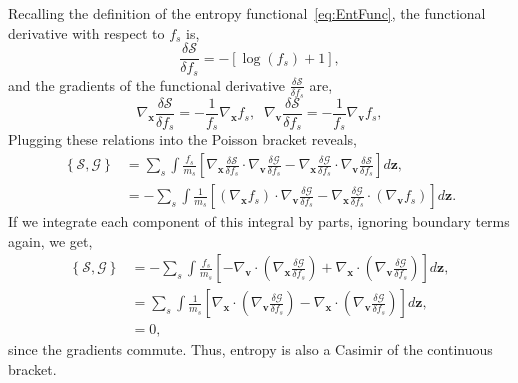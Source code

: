 \documentclass[preprint,12pt]{elsarticle}
\theoremstyle{definition}
\begin{document}
Recalling the definition of the entropy functional~\eqref{eq:EntFunc}, the functional derivative with respect to $f_s$ is,
\begin{equation*}
  \frac{\delta \mathcal{S}}{\delta f_s} = - \left[\log (f_s) + 1\right],
\end{equation*}
and the gradients of the functional derivative $\frac{\delta \mathcal{S}}{\delta f_s}$ are,
\begin{equation*}
  \nabla_{\boldsymbol{x}} \frac{\delta \mathcal{S}}{\delta f_s} = -\frac{1}{f_s} \nabla_{\boldsymbol{x}} f_s, \;\; \nabla_{\boldsymbol{v}} \frac{\delta \mathcal{S}}{\delta f_s} = -\frac{1}{f_s} \nabla_{\boldsymbol{v}} f_s,
\end{equation*}
Plugging these relations into the Poisson bracket reveals,
\begin{align*}
  \left\{\mathcal{S},\mathcal{G}\right\} &= \sum_s \int \frac{f_s}{m_s} \left[\nabla_{\boldsymbol{x}} \frac{\delta \mathcal{S}}{\delta f_s} \cdot \nabla_{\boldsymbol{v}} \frac{\delta \mathcal{G}}{\delta f_s} - \nabla_{\boldsymbol{x}} \frac{\delta \mathcal{G}}{\delta f_s} \cdot \nabla_{\boldsymbol{v}} \frac{\delta \mathcal{S}}{\delta f_s} \right] d\boldsymbol{z}, \\
  &= -\sum_s \int \frac{1}{m_s} \left[\left( \nabla_{\boldsymbol{x}} f_s\right) \cdot \nabla_{\boldsymbol{v}} \frac{\delta \mathcal{G}}{\delta f_s} - \nabla_{\boldsymbol{x}} \frac{\delta \mathcal{G}}{\delta f_s} \cdot \left(\nabla_{\boldsymbol{v}} f_s\right) \right] d\boldsymbol{z}.
\end{align*}
If we integrate each component of this integral by parts, ignoring boundary terms again, we get,
\begin{align*}
  \left\{\mathcal{S},\mathcal{G}\right\} &= -\sum_s \int \frac{f_s}{m_s} \left[-\nabla_{\boldsymbol{v}} \cdot \left( \nabla_{\boldsymbol{x}} \frac{\delta \mathcal{G}}{\delta f_s}\right) + \nabla_{\boldsymbol{x}} \cdot \left(\nabla_{\boldsymbol{v}} \frac{\delta \mathcal{G}}{\delta f_s}\right) \right] d\boldsymbol{z},\\
  &= \sum_s \int \frac{1}{m_s} \left[\nabla_{\boldsymbol{x}} \cdot \left( \nabla_{\boldsymbol{v}} \frac{\delta \mathcal{G}}{\delta f_s}\right) - \nabla_{\boldsymbol{x}} \cdot \left(\nabla_{\boldsymbol{v}} \frac{\delta \mathcal{G}}{\delta f_s}\right) \right] d\boldsymbol{z},\\
  &= 0,
\end{align*}
since the gradients commute. Thus, entropy is also a Casimir of the continuous bracket.
\end{document}
